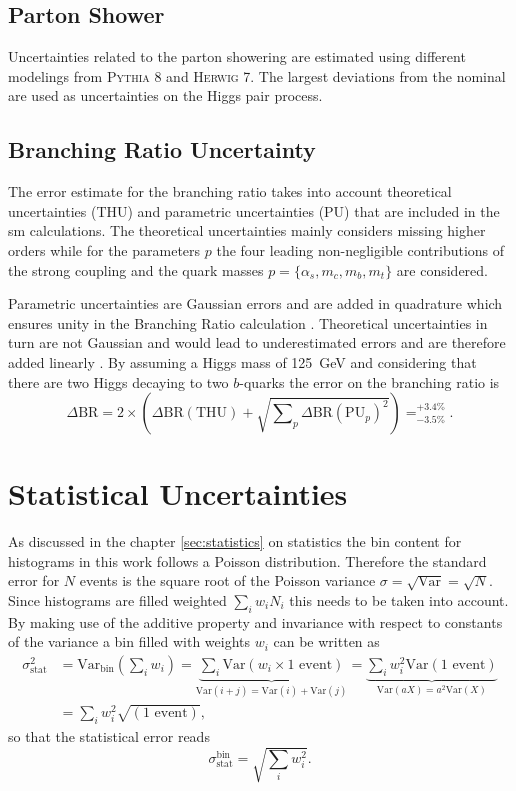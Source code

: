 \subsection{Parton Shower}
Uncertainties related to the parton showering are estimated using different modelings from \textsc{Pythia 8} and \textsc{Herwig 7}. The largest deviations from the nominal are used as uncertainties on the Higgs pair process. 


\subsection{Branching Ratio Uncertainty}
The error estimate for the branching ratio takes into account theoretical uncertainties (THU) and parametric uncertainties (PU) that are included in the \ac{sm} calculations. The theoretical uncertainties mainly considers missing higher orders while for the parameters $p$ the four leading non-negligible contributions of the strong coupling and the quark masses $p=\{\alpha_s,m_c,m_b,m_t\}$ are considered.

Parametric uncertainties are Gaussian errors and are added in quadrature which ensures unity in the Branching Ratio calculation \citep{de2016arxiv}. Theoretical uncertainties in turn are not Gaussian and would lead to underestimated errors and are therefore added linearly \citep{de2016arxiv}. By assuming a Higgs mass of \qty[]{125}{GeV} and considering that there are two Higgs decaying to two $b$-quarks the error on the branching ratio is
\begin{equation}
    \Delta\text{BR} = 2 \times \left(\Delta\text{BR}(\text{THU}) + \sqrt{\sum\nolimits_{p} \Delta\text{BR}(\text{PU}_{p})^2 }\right) = _{-3.5\%}^{+3.4\%}.
\end{equation}

\section{Statistical Uncertainties}
As discussed in the chapter \ref{sec:statistics} on statistics the bin content for histograms in this work follows a Poisson distribution. Therefore the standard error for $N$ events is the square root of the Poisson variance $\sigma=\sqrt{\text{Var}}=\sqrt{N}$. Since histograms are filled weighted $\sum_i w_i N_i$ this needs to be taken into account. By making use of the additive property and invariance with respect to constants of the variance a bin filled with weights $w_i$ can be written as
\begin{align}
    \sigma_\text{stat}^2 & = \text{Var}_\text{bin}\left(\sum_i w_i\right)
    =
    \underbrace{\sum_i \text{Var}(w_i \times 1\text{ event})}_{\text{Var}(i+j)=\text{Var}(i)+\text{Var}(j)}
    =
    \underbrace{\sum_i w_i^2\text{Var}(1\text{ event})}_{\text{Var}(aX)=a^2\text{Var}(X)} \\ \nonumber
                         & =\sum_i w_i^2\sqrt{(1\text{ event})},
\end{align}
so that the statistical error reads
\begin{equation}
    \sigma_\text{stat}^\text{bin}=\sqrt{\sum_i w_i^2}.
\end{equation}

